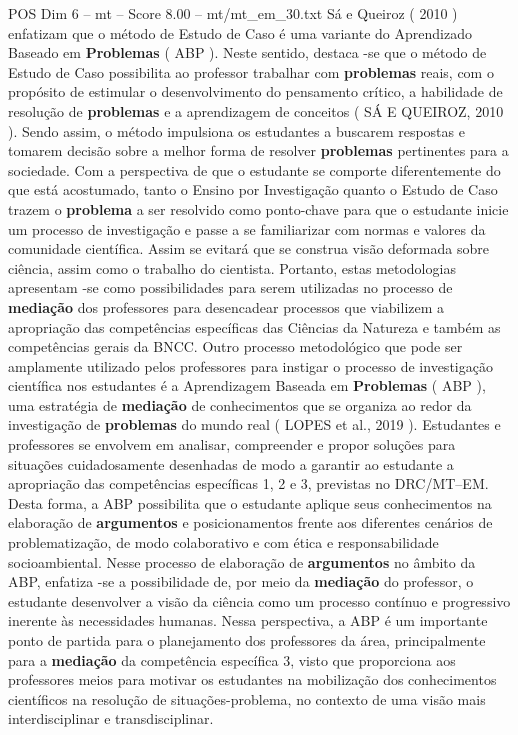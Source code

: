 \begin{textsample}{POS Dim 6 – mt – Score 8.00 – mt/mt\_em\_30.txt}
Sá e Queiroz ( 2010 ) enfatizam que o método de Estudo de Caso é uma variante do Aprendizado Baseado em \textbf{Problemas} ( ABP ).
Neste sentido, destaca -se que o método de Estudo de Caso possibilita ao professor trabalhar com \textbf{problemas} reais, com o propósito de estimular o desenvolvimento do pensamento crítico, a habilidade de resolução de \textbf{problemas} e a aprendizagem de conceitos ( SÁ E QUEIROZ, 2010 ).
Sendo assim, o método impulsiona os estudantes a buscarem respostas e tomarem decisão sobre a melhor forma de resolver \textbf{problemas} pertinentes para a sociedade.
Com a perspectiva de que o estudante se comporte diferentemente do que está acostumado, tanto o Ensino por Investigação quanto o Estudo de Caso trazem o \textbf{problema} a ser resolvido como ponto-chave para que o estudante inicie um processo de investigação e passe a se familiarizar com normas e valores da comunidade científica.
Assim se evitará que se construa visão deformada sobre ciência, assim como o trabalho do cientista.
Portanto, estas metodologias apresentam -se como possibilidades para serem utilizadas no processo de \textbf{mediação} dos professores para desencadear processos que viabilizem a apropriação das competências específicas das Ciências da Natureza e também as competências gerais da BNCC.
Outro processo metodológico que pode ser amplamente utilizado pelos professores para instigar o processo de investigação científica nos estudantes é a Aprendizagem Baseada em \textbf{Problemas} ( ABP ), uma estratégia de \textbf{mediação} de conhecimentos que se organiza ao redor da investigação de \textbf{problemas} do mundo real ( LOPES et al., 2019 ).
Estudantes e professores se envolvem em analisar, compreender e propor soluções para situações cuidadosamente desenhadas de modo a garantir ao estudante a apropriação das competências específicas 1, 2 e 3, previstas no DRC/MT–EM.
Desta forma, a ABP possibilita que o estudante aplique seus conhecimentos na elaboração de \textbf{argumentos} e posicionamentos frente aos diferentes cenários de problematização, de modo colaborativo e com ética e responsabilidade socioambiental.
Nesse processo de elaboração de \textbf{argumentos} no âmbito da ABP, enfatiza -se a possibilidade de, por meio da \textbf{mediação} do professor, o estudante desenvolver a visão da ciência como um processo contínuo e progressivo inerente às necessidades humanas.
Nessa perspectiva, a ABP é um importante ponto de partida para o planejamento dos professores da área, principalmente para a \textbf{mediação} da competência específica 3, visto que proporciona aos professores meios para motivar os estudantes na mobilização dos conhecimentos científicos na resolução de situações-problema, no contexto de uma visão mais interdisciplinar e transdisciplinar.

\end{textsample}
